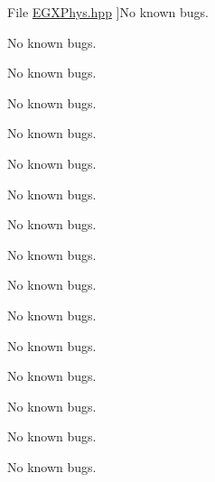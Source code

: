 \begin{DoxyRefList}
%
File \hyperlink{_e_g_x_phys_8hpp}{E\+G\+X\+Phys.hpp} ]No known bugs.  
\item[\label{bug__bug000032}%
\Hypertarget{bug__bug000032}%
File \hyperlink{_e_g_x_phys_constants_8hpp}{E\+G\+X\+Phys\+Constants.hpp} ]No known bugs.  
\item[\label{bug__bug000025}%
\Hypertarget{bug__bug000025}%
File \hyperlink{_half_life_8hpp}{Half\+Life.hpp} ]No known bugs.  
\item[\label{bug__bug000026}%
\Hypertarget{bug__bug000026}%
File \hyperlink{_half_life_8inl}{Half\+Life.inl} ]No known bugs.  
\item[\label{bug__bug000033}%
\Hypertarget{bug__bug000033}%
File \hyperlink{_kinematics_8hpp}{Kinematics.hpp} ]No known bugs.  
\item[\label{bug__bug000034}%
\Hypertarget{bug__bug000034}%
File \hyperlink{_kinematics_constants_8hpp}{Kinematics\+Constants.hpp} ]No known bugs.  
\item[\label{bug__bug000043}%
\Hypertarget{bug__bug000043}%
File \hyperlink{_lorentz_transformations_8hpp}{Lorentz\+Transformations.hpp} ]No known bugs.  
\item[\label{bug__bug000044}%
\Hypertarget{bug__bug000044}%
File \hyperlink{_lorentz_transformations_8inl}{Lorentz\+Transformations.inl} ]No known bugs.  
\item[\label{bug__bug000011}%
\Hypertarget{bug__bug000011}%
File \hyperlink{_luminosity_8hpp}{Luminosity.hpp} ]No known bugs.  
\item[\label{bug__bug000012}%
\Hypertarget{bug__bug000012}%
File \hyperlink{_luminosity_8inl}{Luminosity.inl} ]No known bugs.  
\item[\label{bug__bug000027}%
\Hypertarget{bug__bug000027}%
File \hyperlink{_mean_lifetime_8hpp}{Mean\+Lifetime.hpp} ]No known bugs.  
\item[\label{bug__bug000035}%
\Hypertarget{bug__bug000035}%
File \hyperlink{_optics_8hpp}{Optics.hpp} ]No known bugs.  
\item[\label{bug__bug000036}%
\Hypertarget{bug__bug000036}%
File \hyperlink{_optics_constants_8hpp}{Optics\+Constants.hpp} ]No known bugs.  
\item[\label{bug__bug000013}%
\Hypertarget{bug__bug000013}%
File \hyperlink{_orbital_charecteristics_8hpp}{Orbital\+Charecteristics.hpp} ]No known bugs.  
\item[\label{bug__bug000014}%
\Hypertarget{bug__bug000014}%
File \hyperlink{_orbital_charecteristics_8inl}{Orbital\+Charecteristics.inl} ]No known bugs.  
\item[\label{bug__bug000009}%
\Hypertarget{bug__bug000009}%
File \hyperlink{_periapsis_8hpp}{Periapsis.hpp} ]No known bugs. 


\end{DoxyRefList}
